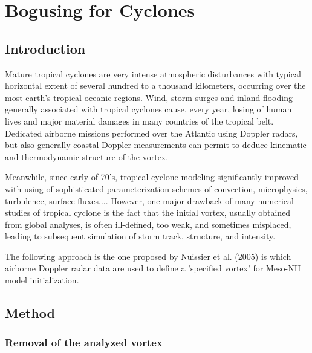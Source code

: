 
\chapter{Bogusing for Cyclones}

\minitoc
\section{Introduction}
Mature tropical cyclones are very intense atmospheric disturbances with 
typical horizontal extent of several hundred to a thousand kilometers, 
occurring over the most earth's tropical oceanic regions. Wind, storm surges 
and inland flooding generally associated with tropical cyclones cause, 
every year, losing of human lives and major material damages in many 
countries of the tropical belt. Dedicated airborne missions performed over 
the Atlantic using Doppler radars, but also generally coastal Doppler 
measurements can permit to deduce kinematic and thermodynamic structure of 
the vortex. 

Meanwhile, since early of 70's, tropical cyclone modeling significantly 
improved with using of sophisticated parameterization schemes of convection, 
microphysics, turbulence, surface fluxes,... However, one major drawback of many 
numerical studies of tropical cyclone is the fact that the initial vortex, 
usually obtained from global analyses, is often ill-defined, too weak, and 
sometimes misplaced, leading to subsequent simulation of storm track, structure, 
and intensity.

The following approach is the one proposed by Nuissier et al. (2005) is which 
airborne Doppler radar data are used to define a 'specified vortex' for Meso-NH
model initialization.

\section{Method}


\subsection{Removal of the analyzed vortex}

